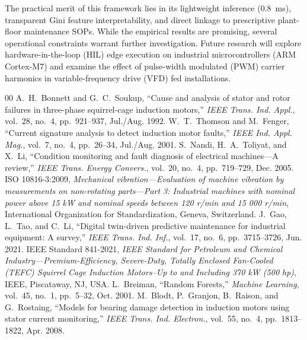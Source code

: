 \documentclass[conference]{IEEEtran}
\begin{document}
The practical merit of this framework lies in its lightweight inference (0.8~ms), transparent Gini feature interpretability, and direct linkage to prescriptive plant-floor maintenance SOPs. While the empirical results are promising, several operational constraints warrant further investigation. Future research will explore hardware-in-the-loop (HIL) edge execution on industrial microcontrollers (ARM Cortex-M7) and examine the effect of pulse-width modulated (PWM) carrier harmonics in variable-frequency drive (VFD) fed installations.

\begin{thebibliography}{00}
 A.~H.~Bonnett and G.~C.~Soukup, ``Cause and analysis of stator and rotor failures in three-phase squirrel-cage induction motors,'' \emph{IEEE Trans. Ind. Appl.}, vol.~28, no.~4, pp.~921--937, Jul./Aug. 1992.
 W.~T.~Thomson and M.~Fenger, ``Current signature analysis to detect induction motor faults,'' \emph{IEEE Ind. Appl. Mag.}, vol.~7, no.~4, pp.~26--34, Jul./Aug. 2001.
 S.~Nandi, H.~A.~Toliyat, and X.~Li, ``Condition monitoring and fault diagnosis of electrical machines---A review,'' \emph{IEEE Trans. Energy Convers.}, vol.~20, no.~4, pp.~719--729, Dec. 2005.
 ISO 10816-3:2009, \emph{Mechanical vibration---Evaluation of machine vibration by measurements on non-rotating parts---Part 3: Industrial machines with nominal power above 15 kW and nominal speeds between 120 r/min and 15 000 r/min}, International Organization for Standardization, Geneva, Switzerland.
 J.~Gao, L.~Tao, and C.~Li, ``Digital twin-driven predictive maintenance for industrial equipment: A survey,'' \emph{IEEE Trans. Ind. Inf.}, vol.~17, no.~6, pp.~3715--3726, Jun. 2021.
 IEEE Standard 841-2021, \emph{IEEE Standard for Petroleum and Chemical Industry---Premium-Efficiency, Severe-Duty, Totally Enclosed Fan-Cooled (TEFC) Squirrel Cage Induction Motors--Up to and Including 370 kW (500 hp)}, IEEE, Piscataway, NJ, USA.
 L.~Breiman, ``Random Forests,'' \emph{Machine Learning}, vol.~45, no.~1, pp.~5--32, Oct. 2001.
 M.~Blodt, P.~Granjon, B.~Raison, and G.~Rostaing, ``Models for bearing damage detection in induction motors using stator current monitoring,'' \emph{IEEE Trans. Ind. Electron.}, vol.~55, no.~4, pp.~1813--1822, Apr. 2008.
\end{thebibliography}
\end{document}
